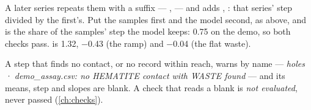 A later series repeats them with a suffix — ,  — and adds , : that series' step divided by the first's. Put the samples first and the model second, as above, and  is the share of the samples' step the model keeps: 0.75 on the demo, so both checks pass.  is 1.32,  −0.43 (the ramp) and  −0.04 (the flat waste).

A step that finds no contact, or no record within reach, warns by name — \emph{holes · demo\_assay.csv: no HEMATITE contact with WASTE found} — and its means, step and slopes are blank. A check that reads a blank is \emph{not evaluated}, never passed (\cref{ch:checks}).
